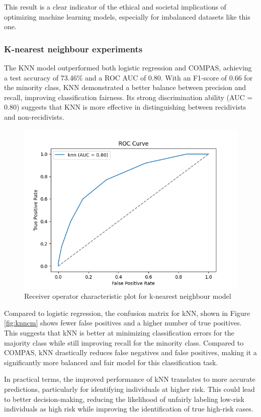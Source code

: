 This result is a clear indicator of the ethical and societal implications of optimizing machine learning models, especially for imbalanced datasets like this one.



\bigskip
\subsubsection{K-nearest neighbour experiments}

The KNN model outperformed both logistic regression and COMPAS, achieving a test accuracy of 73.46\% and a ROC AUC of 0.80. With an F1-score of 0.66 for the minority class, KNN demonstrated a better balance between precision and recall, improving classification fairness. Its strong discrimination ability (AUC = 0.80) suggests that KNN is more effective in distinguishing between recidivists and non-recidivists.

\begin{figure}[H]
	\centering
	\includegraphics[width=0.7\linewidth]{img/knn_roc}
	\caption{Receiver operator characteristic plot for k-nearest neighbour model}
	\label{fig:knnroc}
\end{figure}

Compared to logistic regression, the confusion matrix for kNN, shown in Figure \ref{fig:knncm} shows fewer false positives and a higher number of true positives. This suggests that kNN is better at minimizing classification errors for the majority class while still improving recall for the minority class. Compared to COMPAS, kNN drastically reduces false negatives and false positives, making it a significantly more balanced and fair model for this classification task.

In practical terms, the improved performance of kNN translates to more accurate predictions, particularly for identifying individuals at higher risk. This could lead to better decision-making, reducing the likelihood of unfairly labeling low-risk individuals as high risk while improving the identification of true high-risk cases. 	


